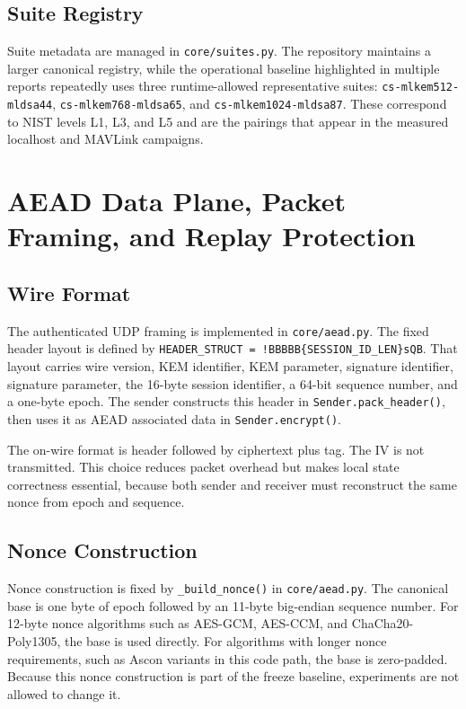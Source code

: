\documentclass[11pt]{article}
\begin{document}
\subsection{Suite Registry}
Suite metadata are managed in \texttt{core/suites.py}. The repository maintains a larger canonical registry, while the operational baseline highlighted in multiple reports repeatedly uses three runtime-allowed representative suites: \texttt{cs-mlkem512-mldsa44}, \texttt{cs-mlkem768-mldsa65}, and \texttt{cs-mlkem1024-mldsa87}. These correspond to NIST levels L1, L3, and L5 and are the pairings that appear in the measured localhost and MAVLink campaigns.

\section{AEAD Data Plane, Packet Framing, and Replay Protection}
\subsection{Wire Format}
The authenticated UDP framing is implemented in \texttt{core/aead.py}. The fixed header layout is defined by \texttt{HEADER\_STRUCT = !BBBBB\{SESSION\_ID\_LEN\}sQB}. That layout carries wire version, KEM identifier, KEM parameter, signature identifier, signature parameter, the 16-byte session identifier, a 64-bit sequence number, and a one-byte epoch. The sender constructs this header in \texttt{Sender.pack\_header()}, then uses it as AEAD associated data in \texttt{Sender.encrypt()}.

The on-wire format is header followed by ciphertext plus tag. The IV is not transmitted. This choice reduces packet overhead but makes local state correctness essential, because both sender and receiver must reconstruct the same nonce from epoch and sequence.

\subsection{Nonce Construction}
Nonce construction is fixed by \texttt{\_build\_nonce()} in \texttt{core/aead.py}. The canonical base is one byte of epoch followed by an 11-byte big-endian sequence number. For 12-byte nonce algorithms such as AES-GCM, AES-CCM, and ChaCha20-Poly1305, the base is used directly. For algorithms with longer nonce requirements, such as Ascon variants in this code path, the base is zero-padded. Because this nonce construction is part of the freeze baseline, experiments are not allowed to change it.
\end{document}
